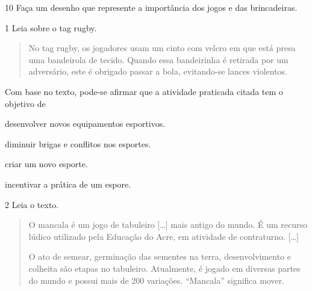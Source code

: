 \num{10} Faça um desenho que represente a importância dos jogos e das brincadeiras.

\begin{mdframed}[linewidth=2pt,linecolor=salmao]
\vspace{10cm}
\end{mdframed}


\num{1} Leia sobre o tag rugby.
\begin{quote}
  No tag rugby, os jogadores usam um cinto com
  velcro em que está presa uma bandeirola de tecido. Quando essa bandeirinha é retirada
  por um adversário, este é obrigado passar a bola, evitando-se lances violentos.

\end{quote}

\noindent{}Com base no texto, pode-se afirmar que a atividade praticada citada tem o objetivo de

\begin{escolha}
\item desenvolver novos equipamentos esportivos.

\item diminuir brigas e conflitos nos esportes.

\item criar um novo esporte.

\item incentivar a prática de um espore.
\end{escolha}


\num{2} Leia o texto.

\begin{quote}
O mancala é um jogo de tabuleiro {[}\ldots{}{]} mais antigo do mundo. É um
recurso lúdico utilizado pela Educação do Acre, em atividade
de contraturno. {[}\ldots{}{]}

O ato de semear, germinação das sementes na terra, desenvolvimento e
colheita são etapas no tabuleiro. Atualmente, é jogado em diversas
partes do mundo e possui mais de 200 variações. “Mancala” significa
mover.

\end{quote}

